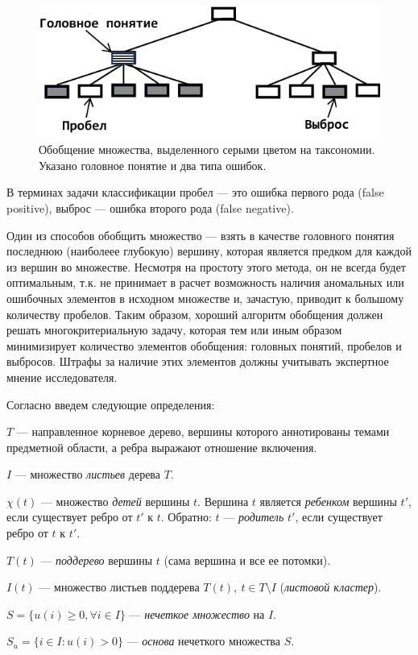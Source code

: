 \documentclass[12pt]{article}
\newenvironment{itemize*}%
{\begin{itemize}%
	\setlength{\itemsep}{0pt}%
	\setlength{\parskip}{0pt}}%
{\end{itemize}}
\begin{document}
\begin{figure}
\centering
\includegraphics[width=0.5\linewidth]{images/gap_offshoot_example}
\caption{Обобщение множества, выделенного серыми цветом на таксономии. Указано головное понятие и два типа ошибок.}
\label{fig:gap_offshoot_example}
\end{figure}

В терминах задачи классификации пробел --- это  ошибка первого рода (false positive), выброс --- ошибка второго рода (false negative). 

Один из способов обобщить множество --- взять в качестве головного понятия последнюю (наиболеее глубокую) вершину, которая является предком для каждой из вершин во множестве. Несмотря на простоту этого метода, он не всегда будет оптимальным, т.к. не принимает в расчет возможность наличия аномальных или ошибочных элементов в исходном множестве и, зачастую, приводит к большому количеству пробелов. Таким образом, хороший алгоритм обобщения должен решать многокритериальную задачу, которая тем или иным образом минимизирует количество элементов обобщения: головных понятий, пробелов и выбросов. Штрафы за наличие этих элементов должны учитывать экспертное мнение исследователя. 

Согласно \cite{mirkin2018preprint} введем следующие определения:
\begin{itemize*}
	\item $T$ --- направленное корневое дерево, вершины которого аннотированы темами предметной области, а ребра выражают отношение включения.
	\item $I$ --- множество \textit{листьев} дерева $T$.
	\item $\chi(t)$ --- множество \textit{детей} вершины $t$. Вершина $t$ является \textit{ребенком} вершины $t'$, если существует ребро от $t'$ к $t$. Обратно: $t$ --- \textit{родитель} $t'$, если существует ребро от $t$ к $t'$.
	\item $T(t)$ --- \textit{поддерево} вершины $t$ (сама вершина и все ее потомки).
	\item $I(t)$ --- множество листьев поддерева $T(t), \ t\in T\setminus I$ (\textit{листовой кластер}).
	
	\item $S=\{u(i)\geq0,\forall i\in I\}$ --- \textit{нечеткое множество} на $I$.
	\item $S_u=\{i\in I: u(i)>0\}$ --- \textit{основа} нечеткого множества $S$.
\end{itemize*}
\end{document}
